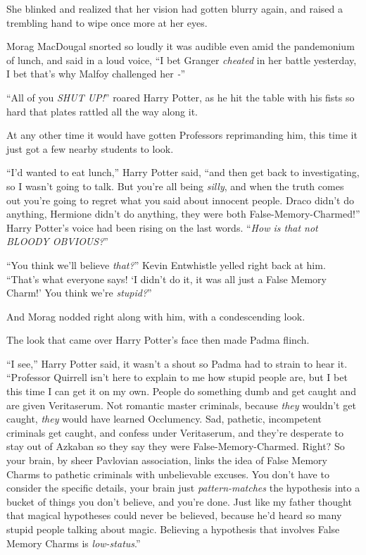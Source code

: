 She blinked and realized that her vision had gotten blurry again, and raised a trembling hand to wipe once more at her eyes.

Morag MacDougal snorted so loudly it was audible even amid the pandemonium of lunch, and said in a loud voice, ``I bet Granger \emph{cheated} in her battle yesterday, I bet that's why Malfoy challenged her \emph{-}''

``All of you \emph{SHUT UP!}'' roared Harry Potter, as he hit the table with his fists so hard that plates rattled all the way along it.

At any other time it would have gotten Professors reprimanding him, this time it just got a few nearby students to look.

``I'd wanted to eat lunch,'' Harry Potter said, ``and then get back to investigating, so I wasn't going to talk. But you're all being \emph{silly}, and when the truth comes out you're going to regret what you said about innocent people. Draco didn't do anything, Hermione didn't do anything, they were both False-Memory-Charmed!'' Harry Potter's voice had been rising on the last words. ``\emph{How is that not BLOODY OBVIOUS?}''

``You think we'll believe \emph{that?}'' Kevin Entwhistle yelled right back at him. ``That's what everyone says! `I didn't do it, it was all just a False Memory Charm!' You think we're \emph{stupid?}''

And Morag nodded right along with him, with a condescending look.

The look that came over Harry Potter's face then made Padma flinch.

``I see,'' Harry Potter said, it wasn't a shout so Padma had to strain to hear it. ``Professor Quirrell isn't here to explain to me how stupid people are, but I bet this time I can get it on my own. People do something dumb and get caught and are given Veritaserum. Not romantic master criminals, because \emph{they} wouldn't get caught, \emph{they} would have learned Occlumency. Sad, pathetic, incompetent criminals get caught, and confess under Veritaserum, and they're desperate to stay out of Azkaban so they say they were False-Memory-Charmed. Right? So your brain, by sheer Pavlovian association, links the idea of False Memory Charms to pathetic criminals with unbelievable excuses. You don't have to consider the specific details, your brain just \emph{pattern-matches} the hypothesis into a bucket of things you don't believe, and you're done. Just like my father thought that magical hypotheses could never be believed, because he'd heard so many stupid people talking about magic. Believing a hypothesis that involves False Memory Charms is \emph{low-status}.''

